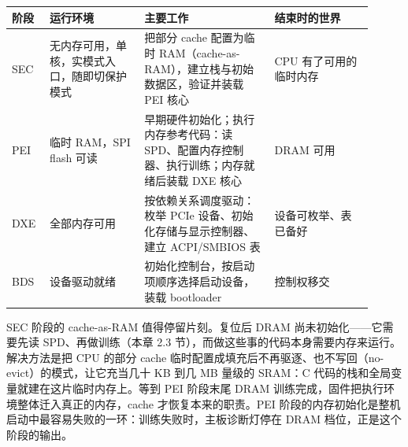 \begin{longtable}{L{0.09\linewidth}L{0.24\linewidth}L{0.33\linewidth}L{0.25\linewidth}}
\toprule
阶段 & 运行环境 & 主要工作 & 结束时的世界 \\
\midrule
SEC & 无内存可用，单核，实模式入口，随即切保护模式 & 把部分 cache 配置为临时 RAM（cache-as-RAM），建立栈与初始数据区，验证并装载 PEI 核心 & CPU 有了可用的临时内存 \\
PEI & 临时 RAM，SPI flash 可读 & 早期硬件初始化；执行内存参考代码：读 SPD、配置内存控制器、执行训练；内存就绪后装载 DXE 核心 & DRAM 可用 \\
DXE & 全部内存可用 & 按依赖关系调度驱动：枚举 PCIe 设备、初始化存储与显示控制器、建立 ACPI/SMBIOS 表 & 设备可枚举、表已备好 \\
BDS & 设备驱动就绪 & 初始化控制台，按启动项顺序选择启动设备，装载 bootloader & 控制权移交 \\
\bottomrule
\end{longtable}

SEC 阶段的 cache-as-RAM 值得停留片刻。复位后 DRAM 尚未初始化——它需要先读 SPD、再做训练（本章 2.3 节），而做这些事的代码本身需要内存来运行。解决方法是把 CPU 的部分 cache 临时配置成填充后不再驱逐、也不写回（no-evict）的模式，让它充当几十 KB 到几 MB 量级的 SRAM：C 代码的栈和全局变量就建在这片临时内存上。等到 PEI 阶段末尾 DRAM 训练完成，固件把执行环境整体迁入真正的内存，cache 才恢复本来的职责。PEI 阶段的内存初始化是整机启动中最容易失败的一环：训练失败时，主板诊断灯停在 DRAM 档位，正是这个阶段的输出。

